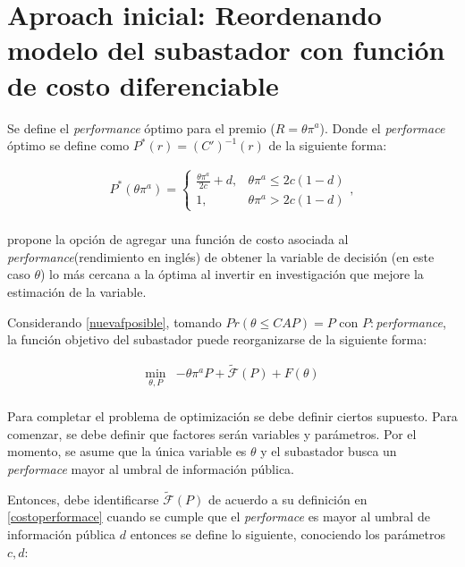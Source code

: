 \section{Aproach inicial: Reordenando modelo del subastador con función de costo diferenciable}\label{Anexo:aproachinicial}

Se define el \emph{performance} óptimo para el premio ($R = \theta \pi^a$). Donde el \emph{performace} óptimo  se define como $P^*(r) = (C')^{-1}(r)$ de la siguiente forma:

\begin{equation}
\begin{array}{rrclcl}
    P^*(\theta \pi^a) = \begin{cases}\frac{\theta \pi^a}{2c}+d,&\theta \pi^a\leq 2c(1-d)\\1,&\theta \pi^a>2c(1-d)\end{cases}, \label{performaceoptimo}\\
\end{array}
\end{equation}

 propone la opción de agregar una función de costo asociada al \textit{performance}(rendimiento en inglés) de obtener la variable de decisión (en este caso $\theta$) lo más cercana a la óptima al invertir en investigación que mejore la estimación de la variable.
\vspace{2.5mm}

Considerando \ref{nuevafposible}, tomando $Pr(\theta\leq CAP) = P$ con $P : $\textit{performance}, la función objetivo del subastador puede reorganizarse de la siguiente forma:

\begin{equation}
\begin{array}{rrclcl}
    \displaystyle \min_{\theta,P} & -\theta \pi^aP + \tilde{\mathcal{F}}(P)+F(\theta)  \label{fo:performance0}\\
\end{array}
\end{equation}

Para completar el problema de optimización se debe definir ciertos supuesto. Para comenzar, se debe definir que factores serán variables y parámetros. Por el momento, se asume que la única variable es $\theta$ y el subastador busca un \textit{performace} mayor al umbral de información pública.  
\vspace{2.5mm}

Entonces, debe identificarse $\tilde{\mathcal{F}}(P)$ de acuerdo a su definición en \ref{costoperformace} cuando se cumple que el \textit{performace} es mayor al umbral de información pública $d$ entonces se define lo siguiente, conociendo los parámetros $c, d$:

